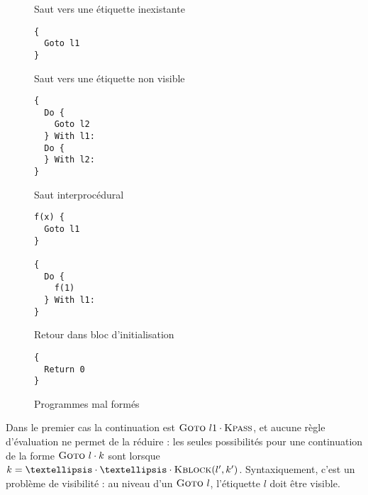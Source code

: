 \begin{figure}
    \centering

\begin{SubFloat}{\label{fig:progmf-a}Saut vers une étiquette inexistante}
\begin{minipage}[b]{0.4\linewidth}
\begin{Verbatim}
{
  Goto l1
}
\end{Verbatim}
\end{minipage}
\end{SubFloat}
\begin{SubFloat}{\label{fig:progmf-b}Saut vers une étiquette non visible}
\begin{minipage}[b]{0.4\linewidth}
\begin{Verbatim}
{
  Do {
    Goto l2
  } With l1:
  Do {
  } With l2:
}
\end{Verbatim}
\end{minipage}
\end{SubFloat}

\vspace{1cm}

\begin{SubFloat}{\label{fig:progmf-c}Saut interprocédural}
\begin{minipage}[b]{0.4\linewidth}
\begin{Verbatim}
f(x) {
  Goto l1
}

{
  Do {
    f(1)
  } With l1:
}
\end{Verbatim}
\end{minipage}
\end{SubFloat}
\begin{SubFloat}{\label{fig:progmf-d}Retour dans bloc d'initialisation}
\begin{minipage}[b]{0.4\linewidth}
\begin{Verbatim}
{
  Return 0
}
\end{Verbatim}
\end{minipage}
\end{SubFloat}

  \caption{Programmes mal formés}
  \label{fig:progmf}
\end{figure}



Dans le premier cas la continuation est $\textsc{Goto}~l1 \cdot \textsc{Kpass}$, et aucune
règle d'évaluation ne permet de la réduire : les seules possibilités pour une
continuation de la forme $\textsc{Goto}~l \cdot k$ sont lorsque $k = … \cdot … \cdot
\kBlock{l'}{k'}$. Syntaxiquement, c'est un problème de visibilité : au niveau
d'un $\textsc{Goto}~l$, l'étiquette $l$ doit être visible.


